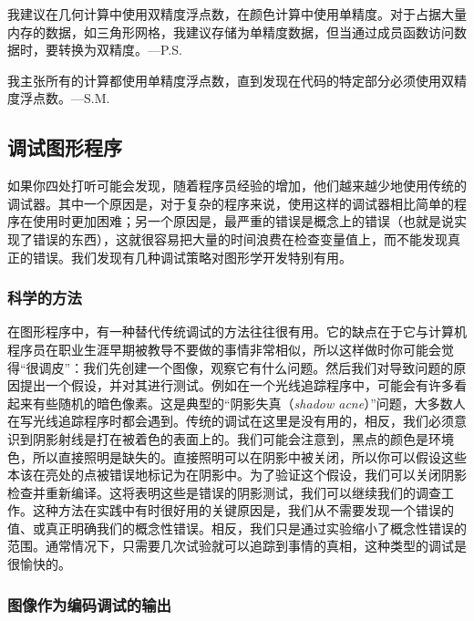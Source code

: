 \documentclass[lang=cn,12pt]{elegantbook}
\begin{document}
\begin{note}
我建议在几何计算中使用双精度浮点数，在颜色计算中使用单精度。对于占据大量内存的数据，如三角形网格，我建议存储为单精度数据，但当通过成员函数访问数据时，要转换为双精度。—P.S.
\end{note}

\begin{note}
我主张所有的计算都使用单精度浮点数，直到发现在代码的特定部分必须使用双精度浮点数。—S.M.
\end{note}

\subsection{调试图形程序}

如果你四处打听可能会发现，随着程序员经验的增加，他们越来越少地使用传统的调试器。其中一个原因是，对于复杂的程序来说，使用这样的调试器相比简单的程序在使用时更加困难；另一个原因是，最严重的错误是概念上的错误（也就是说实现了错误的东西），这就很容易把大量的时间浪费在检查变量值上，而不能发现真正的错误。我们发现有几种调试策略对图形学开发特别有用。

\subsubsection{科学的方法}

在图形程序中，有一种替代传统调试的方法往往很有用。它的缺点在于它与计算机程序员在职业生涯早期被教导不要做的事情非常相似，所以这样做时你可能会觉得“很调皮”：我们先创建一个图像，观察它有什么问题。然后我们对导致问题的原因提出一个假设，并对其进行测试。例如在一个光线追踪程序中，可能会有许多看起来有些随机的暗色像素。这是典型的“阴影失真（\textit{shadow acne}）”问题，大多数人在写光线追踪程序时都会遇到。传统的调试在这里是没有用的，相反，我们必须意识到阴影射线是打在被着色的表面上的。我们可能会注意到，黑点的颜色是环境色，所以直接照明是缺失的。直接照明可以在阴影中被关闭，所以你可以假设这些本该在亮处的点被错误地标记为在阴影中。为了验证这个假设，我们可以关闭阴影检查并重新编译。这将表明这些是错误的阴影测试，我们可以继续我们的调查工作。这种方法在实践中有时很好用的关键原因是，我们从不需要发现一个错误的值、或真正明确我们的概念性错误。相反，我们只是通过实验缩小了概念性错误的范围。通常情况下，只需要几次试验就可以追踪到事情的真相，这种类型的调试是很愉快的。

\subsubsection{图像作为编码调试的输出}
\end{document}
